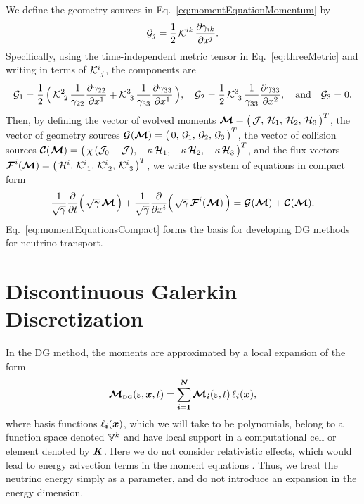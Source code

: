\documentclass[10pt,preprint]{aastex}
\begin{document}
We define the geometry sources in Eq.~\eqref{eq:momentEquationMomentum} by
\begin{equation}
  \mathcal{G}_{j}
  =\frac{1}{2}\,\mathcal{K}^{ik}\,\frac{\partial \gamma_{ik}}{\partial x^{j}}.  
\end{equation}
Specifically, using the time-independent metric tensor in Eq.~\eqref{eq:threeMetric} and writing in terms of $\mathcal{K}^{i}_{~j}$, the components are
\begin{equation}
  \mathcal{G}_{1}
  =\frac{1}{2}\,\Big(\,\mathcal{K}^{2}_{~2}\,\frac{1}{\gamma_{22}}\frac{\partial \gamma_{22}}{\partial x^{1}}+\mathcal{K}^{3}_{~3}\,\frac{1}{\gamma_{33}}\frac{\partial \gamma_{33}}{\partial x^{1}}\,\Big), \quad
  \mathcal{G}_{2}
  =\frac{1}{2}\,\mathcal{K}^{3}_{~3}\,\frac{1}{\gamma_{33}}\frac{\partial \gamma_{33}}{\partial x^{2}}, \quad\text{and}\quad
  \mathcal{G}_{3}
  =0.
\end{equation}
Then, by defining the vector of evolved moments $\boldsymbol{\mathcal{M}}=\big(\,\mathcal{J},\,\mathcal{H}_{1},\,\mathcal{H}_{2},\,\mathcal{H}_{3}\,\big)^{T}$, the vector of geometry sources $\boldsymbol{\mathcal{G}}(\boldsymbol{\mathcal{M}})=\big(\,0,\,\mathcal{G}_{1},\,\mathcal{G}_{2},\,\mathcal{G}_{3}\,\big)^{T}$, the vector of collision sources $\boldsymbol{\mathcal{C}}(\boldsymbol{\mathcal{M}})=\big(\,\chi\,(\mathcal{J}_{0}-\mathcal{J}),\,-\kappa\,\mathcal{H}_{1},\,-\kappa\,\mathcal{H}_{2},\,-\kappa\,\mathcal{H}_{3}\,\big)^{T}$, and the flux vectors $\boldsymbol{\mathcal{F}}^{i}(\boldsymbol{\mathcal{M}})=\big(\,\mathcal{H}^{i},\,\mathcal{K}_{~1}^{i},\,\mathcal{K}_{~2}^{i},\,\mathcal{K}_{~3}^{i}\,\big)^{T}$, we write the system of equations in compact form
\begin{equation}
  \frac{1}{\sqrt{\gamma}}\frac{\partial }{\partial t}\Big(\,\sqrt{\gamma}\,\boldsymbol{\mathcal{M}}\,\Big)
  +\frac{1}{\sqrt{\gamma}}\frac{\partial }{\partial x^{i}}\Big(\,\sqrt{\gamma}\,\boldsymbol{\mathcal{F}}^{i}(\boldsymbol{\mathcal{M}})\,\Big)
  =\boldsymbol{\mathcal{G}}(\boldsymbol{\mathcal{M}})+\boldsymbol{\mathcal{C}}(\boldsymbol{\mathcal{M}}).
  \label{eq:momentEquationsCompact}
\end{equation}
Eq.~\eqref{eq:momentEquationsCompact} forms the basis for developing DG methods for neutrino transport.  

\clearpage

\section{Discontinuous Galerkin Discretization}

In the DG method, the moments are approximated by a local expansion of the form
\begin{equation}
  \boldsymbol{\mathcal{M}}_{\mbox{\tiny DG}}(\varepsilon,\boldsymbol{x},t)
  =\sum_{\boldsymbol{i}=\boldsymbol{1}}^{\boldsymbol{N}}\boldsymbol{\mathcal{M}}_{\boldsymbol{i}}(\varepsilon,t)\,\ell_{\boldsymbol{i}}(\boldsymbol{x}), 
\end{equation}
where basis functions $\ell_{\boldsymbol{i}}(\boldsymbol{x})$, which we will take to be polynomials, belong to a function space denoted $\mathbb{V}^{k}$ and have local support in a computational cell or element denoted by $\boldsymbol{K}$.  
Here we do not consider relativistic effects, which would lead to energy advection terms in the moment equations \citep[cf.][]{cardall_etal_2013a}.  
Thus, we treat the neutrino energy simply as a parameter, and do not introduce an expansion in the energy dimension.  
\end{document}
